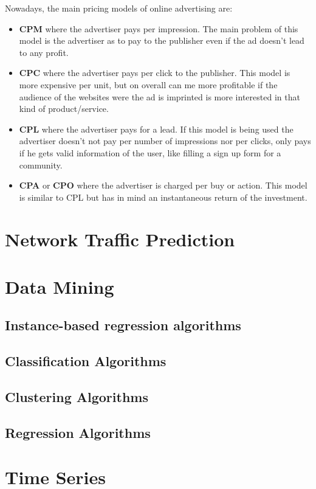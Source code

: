 Nowadays, the main pricing models of online advertising are:
\begin{itemize}
\item\textbf{CPM} where the advertiser pays per impression. The main problem of this model is the advertiser as to pay to the publisher even
if the ad doesn't lead to any profit.
\item\textbf{CPC} where the advertiser pays per click to the publisher. This model is more expensive per unit\cite{Performics}, but on overall can me more
profitable\cite{Performics} if the audience of the websites were the ad is imprinted is more interested in that kind of product/service\cite{Andrea2004}.
\item\textbf{CPL} where the advertiser pays for a lead. If this model is being used the advertiser doesn't not pay per number of impressions nor per clicks,
only pays if he gets valid information of the user, like filling a sign up form for a community.
\item\textbf{CPA} or \textbf{CPO} where the advertiser is charged per buy or action. This model is similar to CPL but has in mind an instantaneous return of
the investment.
\end{itemize}


\section{Network Traffic Prediction}\label{sec:network}

\section{Data Mining}\label{sec:datamining}

\subsection{Instance-based regression algorithms}\label{sec:instance}

\subsection{Classification Algorithms}\label{sec:classification}

\subsection{Clustering Algorithms}\label{sec:clust}

\subsection{Regression Algorithms}\label{sec:regr}

\section{Time Series}\label{sec:timeseries}

